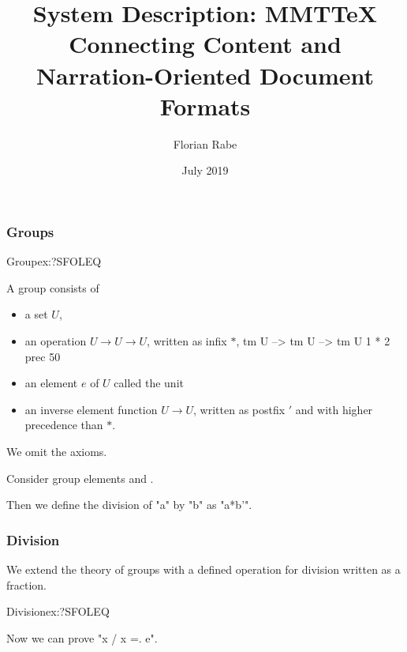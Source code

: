 \documentclass{beamer}
\begin{document}
\title{System Description: MMTTeX \\ \small Connecting Content and Narration-Oriented Document Formats}
\author{Florian Rabe}
\date{July 2019}
\begin{frame}
    \titlepage
\end{frame}





\begin{frame}\frametitle{Groups}

\begin{mmttheory}{Group}{ex:?SFOLEQ}

A group consists of
\begin{itemize}
\item a set $U$,

\item an operation $U\to U \to U$, written as infix $*$,
            {tm U --> tm U --> tm U}   %
            {}                         %
            {1 * 2 prec 50}            %

\item an element $e$ of $U$ called the unit

\item an inverse element function $U\to U$, written as postfix $'$ and with higher precedence than $*$.
\end{itemize}
We omit the axioms.
\bigskip

\begin{mmtcontext}
Consider group elements  and .

Then we define the division of "a" by "b" as "a*b'".
\end{mmtcontext}

\end{mmttheory}

\end{frame}


\begin{frame}\frametitle{Division}

We extend the theory of groups with a defined operation for division written as a fraction.
\begin{mmttheory}{Division}{ex:?SFOLEQ}
\bigskip

Now we can prove "\forall [x] x / x =. e".
\end{mmttheory}
\end{frame}



\end{document}
